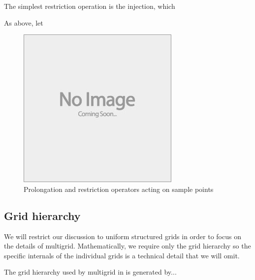 The simplest restriction operation is the injection, which 


As above, let 





\begin{figure}
	\includegraphics[draft]{images/placeholder}
	\caption{Prolongation and restriction operators acting on sample points}
\end{figure}




\subsection{Grid hierarchy}

We will restrict our discussion to uniform structured grids in order to focus on the details of multigrid.
Mathematically, we require only the grid hierarchy so the specific internals of the individual grids is a technical detail that we will omit. 

The grid hierarchy used by multigrid in \oomph is generated by... 



